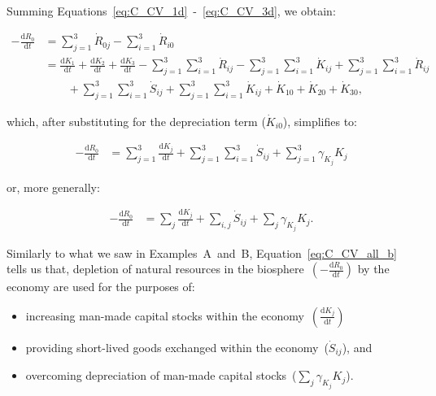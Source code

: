 Summing Equations~\ref{eq:C_CV_1d}~-~\ref{eq:C_CV_3d},
we obtain:

\begin{align}\label{eq:C_CV_all}
	- \frac{\mathrm{d}R_{0}}{\mathrm{d}t}										&
	= \sum_{j = 1}^{3}\dot{R}_{0j}
	- \sum_{i = 1}^{3}\dot{R}_{i0}									\nonumber	\\
	& =\frac{\mathrm{d}K_{1}}{\mathrm{d}t}
	+ \frac{\mathrm{d}K_{2}}{\mathrm{d}t}
	+ \frac{\mathrm{d}K_{3}}{\mathrm{d}t}
	- \sum_{j = 1}^{3}\sum_{i = 1}^{3}\dot{R}_{ij}
	- \sum_{j = 1}^{3}\sum_{i = 1}^{3}\dot{K}_{ij}
	+ \sum_{j = 1}^{3}\sum_{i = 1}^{3}\dot{R}_{ij}		\nonumber	\\
	& \qquad {} + \sum_{j = 1}^{3}\sum_{i = 1}^{3}\dot{S}_{ij}
	+ \sum_{j = 1}^{3}\sum_{i = 1}^{3}\dot{K}_{ij}
	+ \dot{K}_{10}
	+ \dot{K}_{20}
	+ \dot{K}_{30},
\end{align}

\noindent{}which,
after substituting for 
the depreciation term ($\dot{K}_{i0}$),
simplifies to:

\begin{align}\label{eq:C_CV_all_a}
	- \frac{\mathrm{d}R_{0}}{\mathrm{d}t}										&
	=\sum_{j = 1}^{3}\frac{\mathrm{d}K_{j}}{\mathrm{d}t}
	+ \sum_{j = 1}^{3}\sum_{i = 1}^{3}\dot{S}_{ij}
	+ \sum_{j = 1}^{3}\gamma_{K_{j}}K_{j}
\end{align}

\noindent{}or,
more generally:

\begin{align}\label{eq:C_CV_all_b}
	- \frac{\mathrm{d}R_{0}}{\mathrm{d}t}										&
	=\sum_{j}\frac{\mathrm{d}K_{j}}{\mathrm{d}t}
	+ \sum_{i,j}\dot{S}_{ij}
	+ \sum_{j}\gamma_{K_{j}}K_{j}.
\end{align}

Similarly to what we saw in Examples~A~and~B,
Equation~\ref{eq:C_CV_all_b} tells us that,
depletion of natural resources in the 
biosphere~$\left(- \frac{\mathrm{d}R_{0}}{\mathrm{d}t}\right)$
by the economy
are used for the purposes of:

\begin{itemize}
	\item increasing man-made capital stocks
	within the economy~$\left(\frac{\mathrm{d}K_{j}}{\mathrm{d}t}\right)$
	\item providing short-lived goods exchanged within the
	economy~($\dot{S}_{ij}$), and
	\item overcoming depreciation of man-made
	capital stocks~($\sum_{j}\gamma_{K_{j}}K_{j}$).
\end{itemize}

